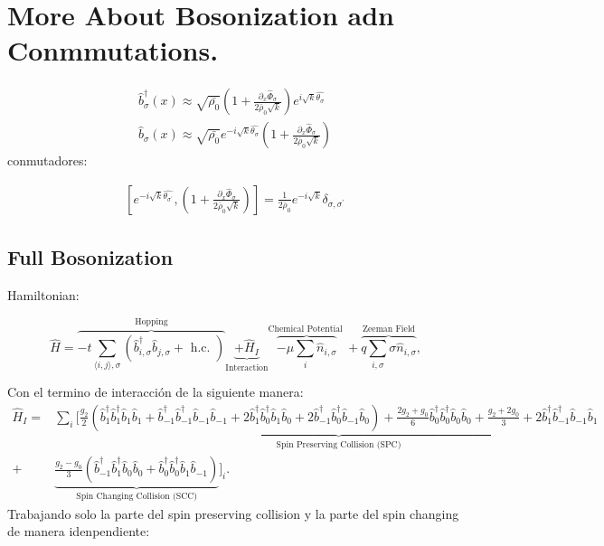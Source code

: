 \chapter{More About Bosonization adn Conmmutations.}
\begin{align}
    \hat{b}_{\sigma}^{\dagger} (x) \approx \sqrt{\bar{\rho_{0}}} \left( 1+\frac{\partial_{x} \hat{\Phi}_{\sigma}} {2\bar{\rho}_{0} \sqrt{k}} \right) e^{i \sqrt{k} \hat{\theta_{\sigma}}}\\
    \hat{b}_{\sigma}^{} (x) \approx \sqrt{\bar{\rho_{0}}} e^{-i \sqrt{k} \hat{\theta_{\sigma}}} \left( 1+\frac{\partial_{x} \hat{\Phi}_{\sigma}} {2\bar{\rho}_{0} \sqrt{k}} \right)
\end{align}
conmutadores:

\begin{align}
    \left[ e^{-i \sqrt{k} \hat{\theta_{\sigma^\prime}}} , \left( 1+\frac{\partial_{x} \hat{\Phi}_{\sigma}} {2\bar{\rho}_{0} \sqrt{k}} \right)\right]= \frac{1}{2\bar{\rho}_0} e^{-i \sqrt{k}} \delta_{\sigma, \sigma ^ \prime} 
\end{align}


\section{Full Bosonization}
Hamiltonian:

\begin{equation}
    \hat{H}=\overbrace{-t \sum_{\langle i, j\rangle, \sigma}\left(\hat{b}_{i, \sigma}^{\dagger} \hat{b}_{j, \sigma}+\text { h.c. }\right)}^{\text {Hopping}} \underbrace{+\hat{H}_I}_{\text {Interaction}} \overbrace{-\mu \sum_i \hat{n}_{i, \sigma}}^{\text {Chemical Potential }}+\overbrace{q \sum_{i, \sigma} \sigma \hat{n}_{i, \sigma}}^{\text {Zeeman Field}} \text{,}
\end{equation}

Con el termino de interacción de la siguiente manera:
\footnotesize 
\begin{align}
    \hat{H}_{I} = &\sum_i \Bigg[ \underbrace{\frac{g_2}{2} \left( \hat{b}_{1}^{\dagger}\hat{b}_{1}^{\dagger} \hat{b}_{1}^{} \hat{b}_{1}^{} 
    + \hat{b}_{-1}^{\dagger}\hat{b}_{-1}^{\dagger} \hat{b}_{-1}^{} \hat{b}_{-1}^{} 
    + 2\hat{b}_{1}^{\dagger}\hat{b}_{0}^{\dagger} \hat{b}_{1}^{} \hat{b}_{0}^{}  
    + 2\hat{b}_{-1}^{\dagger}\hat{b}_{0}^{\dagger} \hat{b}_{-1}^{} \hat{b}_{0}^{} \right) 
    + \frac{2g_{2} + g_{0}}{6} \hat{b}_{0}^{\dagger}\hat{b}_{0}^{\dagger} \hat{b}_{0}^{} \hat{b}_{0}^{}+\frac{g_{2} + 2g_{0}}{3} + 2\hat{b}_{1}^{\dagger}\hat{b}_{-1}^{\dagger} \hat{b}_{-1}^{} \hat{b}_{1}^{} }_{\text {Spin Preserving Collision (SPC)}}  \nonumber \\
 +&\underbrace{\frac{g_{2}-g_{0}}{3} \left( \hat{b}_{-1}^{\dagger}\hat{b}_{1}^{\dagger} \hat{b}_{0}^{} \hat{b}_{0}^{} + \hat{b}_{0}^{\dagger}\hat{b}_{0}^{\dagger} \hat{b}_{1}^{} \hat{b}_{-1}^{}\right)}_{\text {Spin Changing Collision (SCC)}} 
    \Bigg]_{i}.
\end{align}
\normalsize
Trabajando solo la parte del spin preserving collision y la parte del spin changing de manera idenpendiente:

